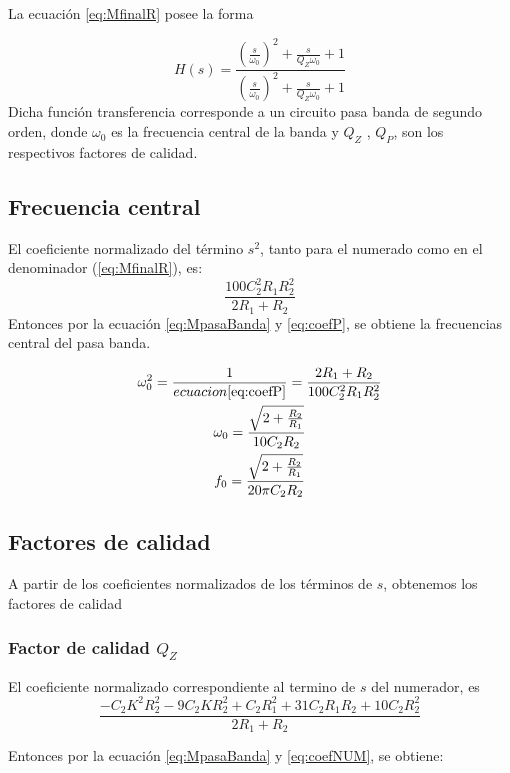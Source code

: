 \documentclass[../../tc_tp3_main.tex]{subfiles}
\begin{document}
La ecuaci\'on \ref{eq:MfinalR} posee la forma

\begin{equation}
H(s)=\frac {\left( \frac{s}{\omega_0} \right) ^2 + \frac{s}{Q_Z \omega_0} +1}{\left( \frac{s}{\omega_0} \right) ^2 +\frac{s}{Q_Z \omega_0}+1} \label{eq:MpasaBanda}
\end{equation}
Dicha función transferencia corresponde a un circuito pasa banda de segundo orden, donde $\omega_0$ es la frecuencia central de la banda y $Q_Z$ , $Q_P$, son los respectivos factores de calidad.
\subsection{Frecuencia central}

El coeficiente normalizado del término $s^2$, tanto para el numerado como en el denominador (\ref{eq:MfinalR}), es:
\begin{equation}
\frac{100 C_{2}^2 R_{1} R_{2} ^2}{2R_1+R_2}  \label{eq:coefP}
\end{equation}
Entonces por la ecuación \ref{eq:MpasaBanda} y \ref{eq:coefP}, se obtiene la frecuencias central del pasa banda.

\begin{gather}
\omega_0^2=\frac{1}{ecuacion \ref{eq:coefP}}=\frac{2R_1+R_2}{100 C_{2}^2 R_{1} R_{2} ^2}   \\
\omega_0=\frac{\sqrt{2+\frac{R_2}{R_1}}}{10C_2 R_2}\\
f_0=\frac{\sqrt{2+\frac{R_2}{R_1}}}{20 \pi C_2 R_2} \label{eq:MfrecCen}
\end{gather}
\subsection{Factores de calidad}
A partir de los coeficientes normalizados de los términos de $s$, obtenemos los factores de calidad




\subsubsection{Factor de calidad $Q_Z$}
El coeficiente normalizado correspondiente al termino de $s$ del numerador, es
\begin{equation}
\frac{-C_2 K ^2 R_2^2 - 9  C_2 K R_2 ^2 + C_2 R_1^2 +31 C_2 R_1 R_2+10 C_2 R_2^2}{2R_1 +R_2} \label{eq:coefNUM}
\end{equation}


Entonces por la ecuación \ref{eq:MpasaBanda} y \ref{eq:coefNUM}, se obtiene:
\end{document}
